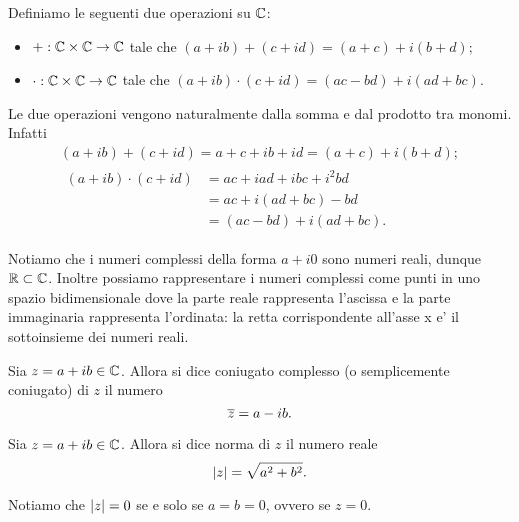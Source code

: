 \begin{definition}
    Definiamo le seguenti due operazioni su $\mathbb{C}$:
    \begin{itemize}
        \item $+ : \mathbb{C} \times \mathbb{C} \to \mathbb{C}$ tale che $(a + ib) + (c + id) = (a + c) + i(b + d)$;
        \item $\cdot : \mathbb{C} \times \mathbb{C} \to \mathbb{C}$ tale che $(a + ib) \cdot (c + id) = (ac - bd) + i(ad + bc)$.
    \end{itemize}
\end{definition}

\begin{remark}
    Le due operazioni vengono naturalmente dalla somma e dal prodotto tra monomi. Infatti \begin{gather*}
        (a + ib) + (c + id) = a + c + ib + id = (a + c) + i(b + d);\\
        \begin{alignedat}{1}
            (a + ib) \cdot (c + id) &= ac + iad + ibc + i^2bd \\
            &= ac + i(ad + bc) -bd \\
            &= (ac - bd) + i(ad + bc).
        \end{alignedat}
    \end{gather*}
\end{remark}

Notiamo che i numeri complessi della forma $a + i0$ sono numeri reali, dunque $\mathbb{R} \subset \mathbb{C}$. Inoltre possiamo rappresentare i numeri complessi come punti in uno spazio bidimensionale dove la parte reale rappresenta l'ascissa e la parte immaginaria rappresenta l'ordinata: la retta corrispondente all'asse x e' il sottoinsieme dei numeri reali.

\begin{definition}
    Sia $z = a+ib \in \mathbb{C}$. Allora si dice coniugato complesso (o semplicemente coniugato) di $z$ il numero \[
        \overline{z} = a - ib.    
    \]
\end{definition}

\begin{definition}
    Sia $z = a + ib \in \mathbb{C}$. Allora si dice norma di $z$ il numero reale \[
        \left|z\right| = \sqrt{a^2 + b^2}.    
    \]
\end{definition}

Notiamo che $\left|z\right| = 0$ se e solo se $a = b = 0$, ovvero se $z = 0$.

